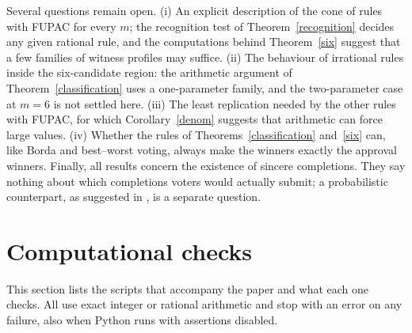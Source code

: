 \documentclass[11pt,a4paper]{article}
\theoremstyle{definition}
\theoremstyle{remark}
\begin{document}
Several questions remain open. (i) An explicit description of the cone of rules with FUPAC for every $m$; the recognition test of Theorem~\ref{recognition} decides any given rational rule, and the computations behind Theorem~\ref{six} suggest that a few families of witness profiles may suffice. (ii) The behaviour of irrational rules inside the six-candidate region: the arithmetic argument of Theorem~\ref{classification} uses a one-parameter family, and the two-parameter case at $m=6$ is not settled here. (iii) The least replication needed by the other rules with FUPAC, for which Corollary~\ref{denom} suggests that arithmetic can force large values. (iv) Whether the rules of Theorems~\ref{classification} and~\ref{six} can, like Borda and best--worst voting, always make the winners exactly the approval winners. Finally, all results concern the existence of sincere completions. They say nothing about which completions voters would actually submit; a probabilistic counterpart, as suggested in \cite[Sect.~4]{tlz}, is a separate question.

\section{Computational checks}\label{sec:checks}
This section lists the scripts that accompany the paper and what each one checks. All use exact integer or rational arithmetic and stop with an error on any failure, also when Python runs with assertions disabled.
\end{document}
